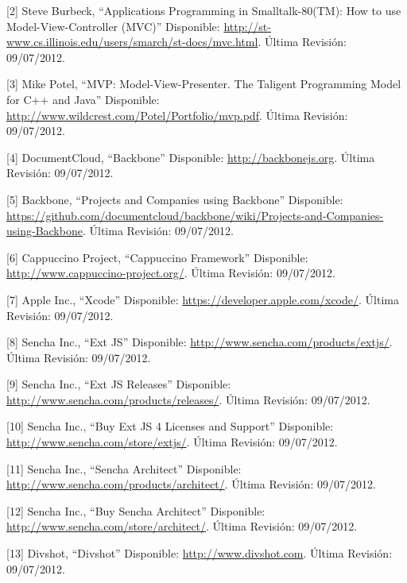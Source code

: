 \documentclass[12pt,spanish,letter]{report}
\begin{document}
{[}2{]} Steve Burbeck, ``Applications Programming in Smalltalk-80(TM):
How to use Model-View-Controller (MVC)'' Disponible:
\href{http://st-www.cs.illinois.edu/users/smarch/st-docs/mvc.html}{http://st-www.cs.illinois.edu/users/smarch/st-docs/mvc.html}.
Última Revisión: 09/07/2012.

{[}3{]} Mike Potel, ``MVP: Model-View-Presenter. The Taligent
Programming Model for C++ and Java'' Disponible:
\href{http://www.wildcrest.com/Potel/Portfolio/mvp.pdf}{http://www.wildcrest.com/Potel/Portfolio/mvp.pdf}.
Última Revisión: 09/07/2012.

{[}4{]} DocumentCloud, ``Backbone'' Disponible:
\href{http://backbonejs.org}{http://backbonejs.org}. Última Revisión:
09/07/2012.

{[}5{]} Backbone, ``Projects and Companies using Backbone'' Disponible:
\href{https://github.com/documentcloud/backbone/wiki/Projects-and-Companies-using-Backbone}{https://github.com/documentcloud/backbone/wiki/Projects-and-Companies-using-Backbone}.
Última Revisión: 09/07/2012.

{[}6{]} Cappuccino Project, ``Cappuccino Framework'' Disponible:
\href{http://www.cappuccino-project.org/}{http://www.cappuccino-project.org/}.
Última Revisión: 09/07/2012.

{[}7{]} Apple Inc., ``Xcode'' Disponible:
\href{https://developer.apple.com/xcode/}{https://developer.apple.com/xcode/}.
Última Revisión: 09/07/2012.

{[}8{]} Sencha Inc., ``Ext JS'' Disponible:
\href{http://www.sencha.com/products/extjs/}{http://www.sencha.com/products/extjs/}.
Última Revisión: 09/07/2012.

{[}9{]} Sencha Inc., ``Ext JS Releases'' Disponible:
\href{http://www.sencha.com/products/releases/}{http://www.sencha.com/products/releases/}.
Última Revisión: 09/07/2012.

{[}10{]} Sencha Inc., ``Buy Ext JS 4 Licenses and Support'' Disponible:
\href{http://www.sencha.com/store/extjs/}{http://www.sencha.com/store/extjs/}.
Última Revisión: 09/07/2012.

{[}11{]} Sencha Inc., ``Sencha Architect'' Disponible:
\href{http://www.sencha.com/products/architect/}{http://www.sencha.com/products/architect/}.
Última Revisión: 09/07/2012.

{[}12{]} Sencha Inc., ``Buy Sencha Architect'' Disponible:
\href{http://www.sencha.com/store/architect/}{http://www.sencha.com/store/architect/}.
Última Revisión: 09/07/2012.

{[}13{]} Divshot, ``Divshot'' Disponible:
\href{http://www.divshot.com}{http://www.divshot.com}. Última Revisión:
09/07/2012.
\end{document}
